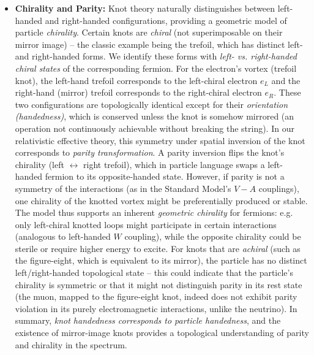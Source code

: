 \documentclass[12pt]{article}
\begin{document}
\begin{itemize}
    \item \textbf{Chirality and Parity:} Knot theory naturally distinguishes between left-handed and right-handed configurations, providing a geometric model of particle \emph{chirality}. Certain knots are \emph{chiral} (not superimposable on their mirror image) – the classic example being the trefoil, which has distinct left- and right-handed forms. We identify these forms with \emph{left- vs. right-handed chiral states} of the corresponding fermion. For the electron’s vortex (trefoil knot), the left-hand trefoil corresponds to the left-chiral electron $e_L$ and the right-hand (mirror) trefoil corresponds to the right-chiral electron $e_R$. These two configurations are topologically identical except for their \emph{orientation (handedness)}, which is conserved unless the knot is somehow mirrored (an operation not continuously achievable without breaking the string). In our relativistic effective theory, this symmetry under spatial inversion of the knot corresponds to \emph{parity transformation}. A parity inversion flips the knot’s chirality (left $\leftrightarrow$ right trefoil), which in particle language swaps a left-handed fermion to its opposite-handed state. However, if parity is not a symmetry of the interactions (as in the Standard Model’s $V-A$ couplings), one chirality of the knotted vortex might be preferentially produced or stable. The model thus supports an inherent \emph{geometric chirality} for fermions: e.g. only left-chiral knotted loops might participate in certain interactions (analogous to left-handed $W$ coupling), while the opposite chirality could be sterile or require higher energy to excite. For knots that are \emph{achiral} (such as the figure-eight, which is equivalent to its mirror), the particle has no distinct left/right-handed topological state – this could indicate that the particle’s chirality is symmetric or that it might not distinguish parity in its rest state (the muon, mapped to the figure-eight knot, indeed does not exhibit parity violation in its purely electromagnetic interactions, unlike the neutrino). In summary, \emph{knot handedness corresponds to particle handedness}, and the existence of mirror-image knots provides a topological understanding of parity and chirality in the spectrum.

\end{itemize}
\end{document}
